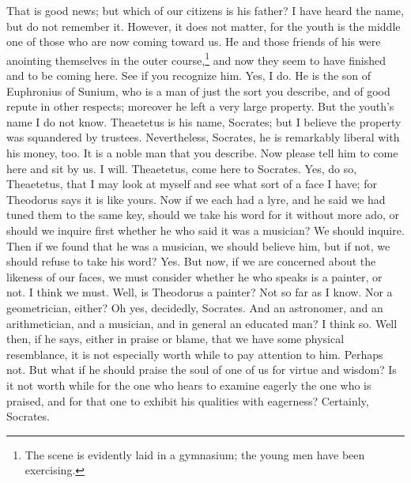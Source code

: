 \documentclass[letterpaper,12pt]{article}
\newcommand{\stephpag}[1]{\marginnote{\small\itshape\fontfamily{ppl}\selectfont #1}}
\begin{document}
\begin{drama}
\socratesspeaks
That is good news; but which of our citizens is his father?
\theodorusspeaks
I have heard the name, but do not remember it. \stephpag{c} However, it does not matter, for the youth is the middle one of those who are now coming toward us. He and those friends of his were anointing themselves in the outer course,\footnote{The scene is evidently laid in a gymnasium; the young men have been exercising.} and now they seem to have finished and to be coming here. See if you recognize him.
\socratesspeaks
Yes, I do. He is the son of Euphronius of Sunium, who is a man of just the sort you describe, and of good repute in other respects; moreover he left a very large property. But the youth's name I do not know. \stephpag{d}
\theodorusspeaks
Theaetetus is his name, Socrates; but I believe the property was squandered by trustees. Nevertheless, Socrates, he is remarkably liberal with his money, too.
\socratesspeaks
It is a noble man that you describe. Now please tell him to come here and sit by us.
\theodorusspeaks
I will. Theaetetus, come here to Socrates.
\socratesspeaks
Yes, do so, Theaetetus, that I may look at myself and see what sort of a face I have; \stephpag{e} for Theodorus says it is like yours. Now if we each had a lyre, and he said we had tuned them to the same key, should we take his word for it without more ado, or should we inquire first whether he who said it was a musician?
\theaetetusspeaks
We should inquire.
\socratesspeaks
Then if we found that he was a musician, we should believe him, but if not, we should refuse to take his word?
\theaetetusspeaks
Yes.
\socratesspeaks
But now, if we are concerned about the likeness of our faces, \stephpag{145 a} we must consider whether he who speaks is a painter, or not.
\theaetetusspeaks
I think we must.
\socratesspeaks
Well, is Theodorus a painter?
\theaetetusspeaks
Not so far as I know.
\socratesspeaks
Nor a geometrician, either?
\theaetetusspeaks
Oh yes, decidedly, Socrates.
\socratesspeaks
And an astronomer, and an arithmetician, and a musician, and in general an educated man?
\theaetetusspeaks
I think so.
\socratesspeaks
Well then, if he says, either in praise or blame, that we have some physical resemblance, it is not especially worth while to pay attention to him.
\theaetetusspeaks
Perhaps not. \stephpag{b}
\socratesspeaks
But what if he should praise the soul of one of us for virtue and wisdom? Is it not worth while for the one who hears to examine eagerly the one who is praised, and for that one to exhibit his qualities with eagerness?
\theaetetusspeaks
Certainly, Socrates.
\socratesspeaks

\end{drama}
\end{document}
